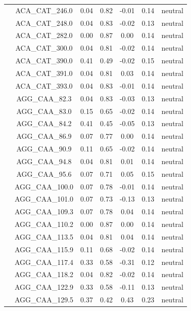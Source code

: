 \documentclass[11pt,]{article}
\begin{document}
\begin{longtable}[c]{@{}lcccccc@{}}
& ACA\_CAT\_246.0 & 0.04 & 0.82 & -0.01 & 0.14 & neutral
\\\addlinespace
& ACA\_CAT\_248.0 & 0.04 & 0.83 & -0.02 & 0.13 & neutral
\\\addlinespace
& ACA\_CAT\_282.0 & 0.00 & 0.87 & 0.00 & 0.14 & neutral
\\\addlinespace
& ACA\_CAT\_300.0 & 0.04 & 0.81 & -0.02 & 0.14 & neutral
\\\addlinespace
& ACA\_CAT\_390.0 & 0.41 & 0.49 & -0.02 & 0.15 & neutral
\\\addlinespace
& ACA\_CAT\_391.0 & 0.04 & 0.81 & 0.03 & 0.14 & neutral
\\\addlinespace
& ACA\_CAT\_393.0 & 0.04 & 0.83 & -0.01 & 0.14 & neutral
\\\addlinespace
& AGG\_CAA\_82.3 & 0.04 & 0.83 & -0.03 & 0.13 & neutral
\\\addlinespace
& AGG\_CAA\_83.0 & 0.15 & 0.65 & -0.02 & 0.14 & neutral
\\\addlinespace
& AGG\_CAA\_84.2 & 0.41 & 0.45 & -0.05 & 0.13 & neutral
\\\addlinespace
& AGG\_CAA\_86.9 & 0.07 & 0.77 & 0.00 & 0.14 & neutral
\\\addlinespace
& AGG\_CAA\_90.9 & 0.11 & 0.65 & -0.02 & 0.14 & neutral
\\\addlinespace
& AGG\_CAA\_94.8 & 0.04 & 0.81 & 0.01 & 0.14 & neutral
\\\addlinespace
& AGG\_CAA\_95.6 & 0.07 & 0.71 & 0.05 & 0.15 & neutral
\\\addlinespace
& AGG\_CAA\_100.0 & 0.07 & 0.78 & -0.01 & 0.14 & neutral
\\\addlinespace
& AGG\_CAA\_101.0 & 0.07 & 0.73 & -0.13 & 0.13 & neutral
\\\addlinespace
& AGG\_CAA\_109.3 & 0.07 & 0.78 & 0.04 & 0.14 & neutral
\\\addlinespace
& AGG\_CAA\_110.2 & 0.00 & 0.87 & 0.00 & 0.14 & neutral
\\\addlinespace
& AGG\_CAA\_113.5 & 0.04 & 0.81 & 0.04 & 0.14 & neutral
\\\addlinespace
& AGG\_CAA\_115.9 & 0.11 & 0.68 & -0.02 & 0.14 & neutral
\\\addlinespace
& AGG\_CAA\_117.4 & 0.33 & 0.58 & -0.31 & 0.12 & neutral
\\\addlinespace
& AGG\_CAA\_118.2 & 0.04 & 0.82 & -0.02 & 0.14 & neutral
\\\addlinespace
& AGG\_CAA\_122.9 & 0.33 & 0.58 & -0.11 & 0.13 & neutral
\\\addlinespace
& AGG\_CAA\_129.5 & 0.37 & 0.42 & 0.43 & 0.23 & neutral

\end{longtable}
\end{document}
